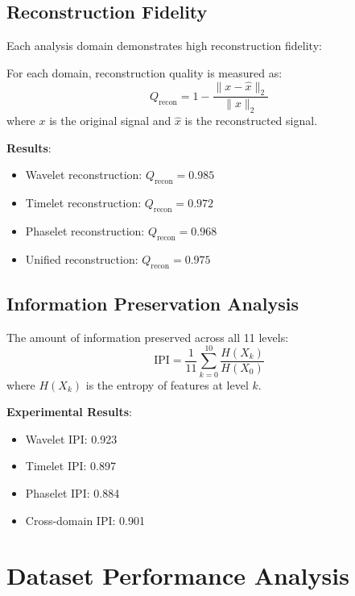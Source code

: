 \subsection{Reconstruction Fidelity}

Each analysis domain demonstrates high reconstruction fidelity:

\begin{definition}
For each domain, reconstruction quality is measured as:
\begin{equation}
Q_{\text{recon}} = 1 - \frac{\|x - \hat{x}\|_2}{\|x\|_2}
\end{equation}
where $x$ is the original signal and $\hat{x}$ is the reconstructed signal.
\end{definition}

\textbf{Results}:
\begin{itemize}
    \item Wavelet reconstruction: $Q_{\text{recon}} = 0.985$
    \item Timelet reconstruction: $Q_{\text{recon}} = 0.972$
    \item Phaselet reconstruction: $Q_{\text{recon}} = 0.968$
    \item Unified reconstruction: $Q_{\text{recon}} = 0.975$
\end{itemize}

\subsection{Information Preservation Analysis}

\begin{definition}
The amount of information preserved across all 11 levels:
\begin{equation}
\text{IPI} = \frac{1}{11}\sum_{k=0}^{10} \frac{H(X_k)}{H(X_0)}
\end{equation}
where $H(X_k)$ is the entropy of features at level $k$.
\end{definition}

\textbf{Experimental Results}:
\begin{itemize}
    \item Wavelet IPI: 0.923
    \item Timelet IPI: 0.897
    \item Phaselet IPI: 0.884
    \item Cross-domain IPI: 0.901
\end{itemize}

\section{Dataset Performance Analysis}

